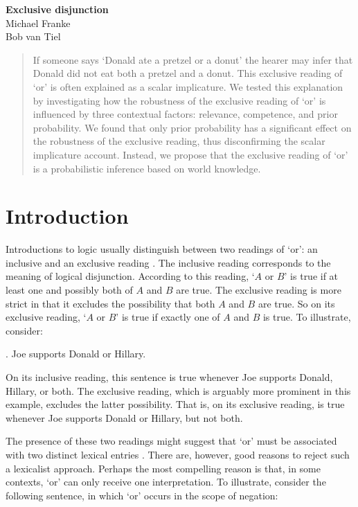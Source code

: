 \documentclass[12pt]{article}
\begin{document}
\begin{center}
\noindent\LARGE \textbf{Exclusive disjunction} \\[.5cm]
\large Michael Franke\\[.1cm] 
\large Bob van Tiel
\end{center}

\begin{abstract}
If someone says `Donald ate a pretzel or a donut' the hearer may infer that Donald did not eat both a pretzel and a donut. This exclusive reading of `or' is often explained as a scalar implicature. We tested this explanation by investigating how the robustness of the exclusive reading of `or' is influenced by three contextual factors: relevance, competence, and prior probability. We found that only prior probability has a significant effect on the robustness of the exclusive reading, thus disconfirming the scalar implicature account. Instead, we propose that the exclusive reading of `or' is a probabilistic inference based on world knowledge.
\end{abstract}

\section{Introduction}

Introductions to logic usually distinguish between two readings of `or': an inclusive and an exclusive reading \citep[e.g.,][]{mccawley1981, copi2005}. The inclusive reading corresponds to the meaning of logical disjunction. According to this reading, `$A$ or $B$' is true if at least one and possibly both of $A$ and $B$ are true. The exclusive reading is more strict in that it excludes the possibility that both $A$ and $B$ are true. So on its exclusive reading, `$A$ or $B$' is true if exactly one of $A$ and $B$ is true. To illustrate, consider:

\ex.	\label{ex:support} Joe supports Donald or Hillary.

On its inclusive reading, this sentence is true whenever Joe supports Donald, Hillary, or both. The exclusive reading, which is arguably more prominent in this example, excludes the latter possibility. That is, on its exclusive reading, \Last is true whenever Joe supports Donald or Hillary, but not both.

The presence of these two readings might suggest that `or' must be associated with two distinct lexical entries \citep[e.g.,][]{basson1960, baum1996, rescher1964}. There are, however, good reasons to reject such a lexicalist approach. Perhaps the most compelling reason is that, in some contexts, `or' can only receive one interpretation. To illustrate, consider the following sentence, in which `or' occurs in the scope of negation:
\end{document}
